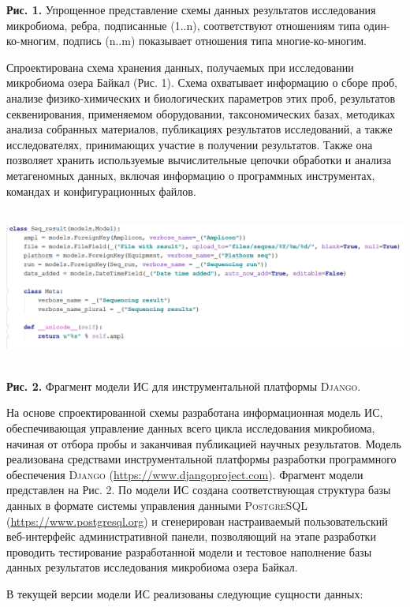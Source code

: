 \documentclass[a4paper,12pt,openany,final]{extreport}
\begin{document}
\textbf{Рис. 1.} Упрощенное представление схемы данных результатов
исследования микробиома, ребра, подписанные (1..n), соответствуют
отношениям типа один-ко-многим, подпись (n..m) показывает отношения типа
многие-ко-многим.

Спроектирована схема хранения данных, получаемых при исследовании
микробиома озера Байкал (Рис. 1). Схема охватывает информацию о сборе
проб, анализе физико-химических и биологических параметров этих проб,
результатов секвенирования, применяемом оборудовании, таксономических
базах, методиках анализа собранных материалов, публикациях результатов
исследований, а также исследователях, принимающих участие в получении
результатов. Также она позволяет хранить используемые вычислительные
цепочки обработки и анализа метагеномных данных, включая информацию о
программных инструментах, командах и конфигурационных файлов.

\includegraphics[width=6.50208in,height=2.03264in]{media/image16.png}

\textbf{Рис. 2.} Фрагмент модели ИС для инструментальной платформы
\textsc{Django}.

На основе спроектированной схемы разработана информационная модель ИС,
обеспечивающая управление данных всего цикла исследования микробиома,
начиная от отбора пробы и заканчивая публикацией научных результатов.
Модель реализована средствами инструментальной платформы разработки
программного обеспечения \textsc{Django}
(\href{https://www.djangoproject.com}{{https://www.djangoproject.com}}).
Фрагмент модели представлен на Рис. 2. По модели ИС создана
соответствующая структура базы данных в формате системы управления
данными \textsc{PostgreSQL}
(\href{https://www.postgresql.org}{{https://www.postgresql.org}}) и
сгенерирован настраиваемый пользовательский веб-интерфейс
административной панели, позволяющий на этапе разработки проводить
тестирование разработанной модели и тестовое наполнение базы данных
результатов исследования микробиома озера Байкал.

В текущей версии модели ИС реализованы следующие сущности данных:
\end{document}
